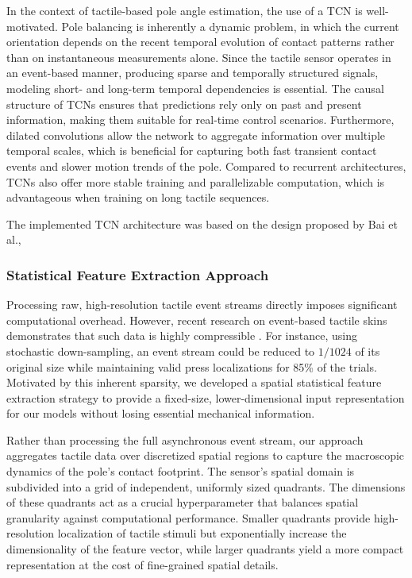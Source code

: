 \documentclass{article}
\begin{document}
In the context of tactile-based pole angle estimation, the use of a TCN
is well-motivated. Pole balancing is inherently
a dynamic problem, in which the current orientation depends on the recent temporal
evolution of contact patterns rather than on instantaneous measurements alone.
Since the tactile sensor operates in an event-based manner,
producing sparse and temporally structured signals,
modeling short- and long-term temporal dependencies is essential.
The causal structure of TCNs ensures that predictions rely only on past and
present information, making them suitable for real-time control scenarios.
Furthermore, dilated convolutions allow the network to aggregate information
over multiple temporal scales, which is beneficial for capturing both fast
transient contact events and slower motion trends of the pole.
Compared to recurrent architectures, TCNs also offer more stable training
and parallelizable computation, which is advantageous when training on long
tactile sequences.

The implemented TCN architecture was based on the design proposed by Bai et al.\cite{bai2018empirical},

\subsubsection{Statistical Feature Extraction Approach}

Processing raw, high-resolution tactile event streams directly imposes significant computational overhead. However, recent research on event-based tactile skins demonstrates that such data is highly compressible \cite{koolani2026event}. For instance, using stochastic down-sampling, an event stream could be reduced to $1/1024$ of its original size while maintaining valid press localizations for 85\% of the trials. Motivated by this inherent sparsity, we developed a spatial statistical feature extraction strategy to provide a fixed-size, lower-dimensional input representation for our models without losing essential mechanical information.

\par Rather than processing the full asynchronous event stream, our approach aggregates tactile data over discretized spatial regions to capture the macroscopic dynamics of the pole's contact footprint. The sensor's spatial domain is subdivided into a grid of independent, uniformly sized quadrants. The dimensions of these quadrants act as a crucial hyperparameter that balances spatial granularity against computational performance. Smaller quadrants provide high-resolution localization of tactile stimuli but exponentially increase the dimensionality of the feature vector, while larger quadrants yield a more compact representation at the cost of fine-grained spatial details.
\end{document}
